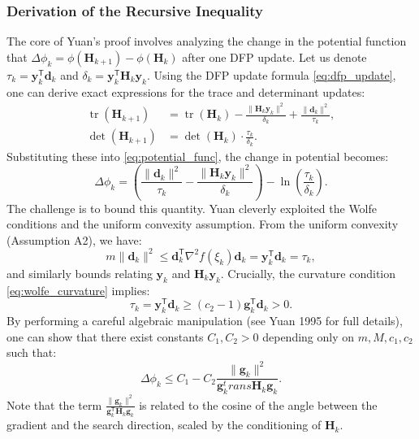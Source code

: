 \documentclass[12pt,a4paper]{article}  %
\newcounter{cite}
\theoremstyle{definition}
\numberwithin{equation}{section}
\DeclareMathOperator{\tr}{tr}
\newcommand{\HH}{\bm{H}}
\newcommand{\yy}{\bm{y}}
\newcommand{\trans}{{\scriptstyle{\mathsf{T}}}}
\newcommand{\dd}{\mathbf{d}}
\renewcommand{\ggg}{\mathbf{g}}
\begin{document}
\subsubsection{Derivation of the Recursive Inequality}
The core of Yuan's proof \cite{yuan1995} involves analyzing the change in the potential function 
that $\Delta \phi_k = \phi(\HH_{k+1}) - \phi(\HH_k)$ after one DFP update. Let us denote $\tau_k = \yy_k^\trans \dd_k$ and $\delta_k = \yy_k^\trans \HH_k \yy_k$. Using the DFP update formula \eqref{eq:dfp_update}, one can derive exact expressions for the trace and determinant updates:
\begin{align}
    \tr(\HH_{k+1}) &= \tr(\HH_k) - \frac{\|\HH_k \yy_k\|^2}{\delta_k} + \frac{\|\dd_k\|^2}{\tau_k}, \label{eq:trace_update} \\
    \det(\HH_{k+1}) &= \det(\HH_k) \cdot \frac{\tau_k}{\delta_k}. \label{eq:det_update}
\end{align}
Substituting these into \eqref{eq:potential_func}, the change in potential becomes:
\begin{equation}
    \Delta \phi_k = \left( \frac{\|\dd_k\|^2}{\tau_k} - \frac{\|\HH_k \yy_k\|^2}{\delta_k} \right) - \ln\left( \frac{\tau_k}{\delta_k} \right).
    \label{eq:delta_phi}
\end{equation}
The challenge is to bound this quantity. Yuan cleverly exploited the Wolfe conditions and the uniform convexity assumption.
From the uniform convexity (Assumption A2), we have:
\begin{equation}
    m \|\dd_k\|^2 \le \dd_k^\trans \nabla^2 f(\xi_k) \dd_k = \yy_k^\trans \dd_k = \tau_k,
\end{equation}
and similarly bounds relating $\yy_k$ and $\HH_k \yy_k$.
Crucially, the curvature condition \eqref{eq:wolfe_curvature} implies:
\begin{equation}
    \tau_k = \yy_k^\trans \dd_k \ge (c_2 - 1) \ggg_k^\trans \dd_k > 0.
\end{equation}
By performing a careful algebraic manipulation (see Yuan 1995 \cite{yuan1995} for full details), one can show that there exist constants $C_1, C_2 > 0$ depending only on $m, M, c_1, c_2$ such that:
\begin{equation}
    \Delta \phi_k \le C_1 - C_2 \dfrac{\|\ggg_k\|^2}{\ggg_k^trans \HH_k \ggg_k}.
    \label{eq:phi_inequality}
\end{equation}
Note that the term $\frac{\|\ggg_k\|^2}{\ggg_k^\trans \HH_k \ggg_k}$ is related to the cosine of the angle between the gradient and the search direction, scaled by the conditioning of $\HH_k$.
\end{document}
